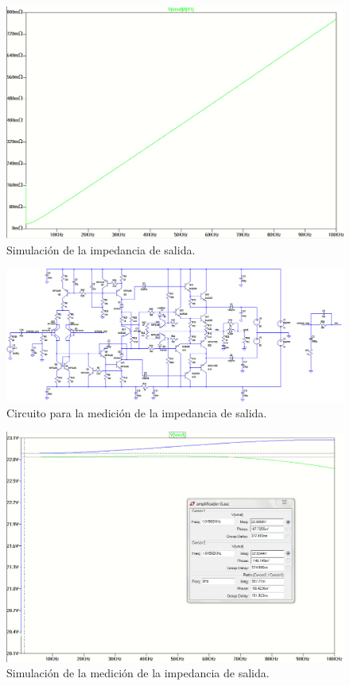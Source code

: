 \begin{figure}[H]
\centering
\includegraphics[width=1\textwidth]{img/Rout_1.png}
\caption{Simulación de la impedancia de salida.}
\label{Rout_sim}
\end{figure}

\begin{figure}[H]
\centering
\includegraphics[width=1\textwidth]{img/Rout_circ_2.png}
\caption{Circuito para la medición de la impedancia de salida.}
\label{Rout_med_circ}
\end{figure}

\begin{figure}[H]
\centering
\includegraphics[width=1\textwidth]{img/Rout_2.png}
\caption{Simulación de la medición de la impedancia de salida.}
\label{Rout_med}
\end{figure}